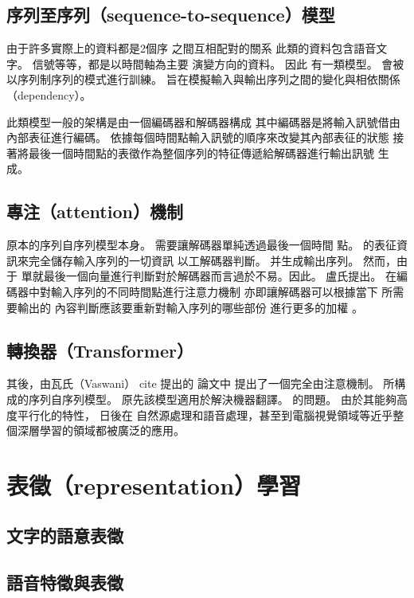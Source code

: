 \subsection{
    序列至序列（sequence-to-sequence）模型}
    
    由于許多實際上的資料都是2個序 之間互相配對的關系 此類的資料包含語音文字。 信號等等，都是以時間軸為主要 演變方向的資料。 因此 有一類模型。 會被以序列制序列的模式進行訓練。 旨在模擬輸入與輸出序列之間的變化與相依關係（dependency）。

此類模型一般的架構是由一個編碼器和解碼器構成 其中編碼器是將輸入訊號借由內部表征進行編碼。 依據每個時間點輸入訊號的順序來改變其內部表征的狀態 接著將最後一個時間點的表徵作為整個序列的特征傳遞給解碼器進行輸出訊號 生成。 
    
\subsection{專注（attention）機制}
    
    原本的序列自序列模型本身。 需要讓解碼器單純透過最後一個時間 點。 的表征資訊來完全儲存輸入序列的一切資訊 以工解碼器判斷。 并生成輸出序列。 然而，由于 單就最後一個向量進行判斷對於解碼器而言過於不易。因此。 盧氏提出。 在編碼器中對輸入序列的不同時間點進行注意力機制 亦即讓解碼器可以根據當下 所需要輸出的 內容判斷應該要重新對輸入序列的哪些部份 進行更多的加權 。

    

\subsection{轉換器（Transformer）}

其後，由瓦氏（Vaswani） cite 提出的 論文中 提出了一個完全由注意機制。 所構成的序列自序列模型。 原先該模型適用於解決機器翻譯。 的問題。
由於其能夠高度平行化的特性， 日後在 自然源處理和語音處理，甚至到電腦視覺領域等近乎整個深層學習的領域都被廣泛的應用。  


\section{表徵（representation）學習}

\subsection{文字的語意表徵}



\subsection{語音特徵與表徵}


